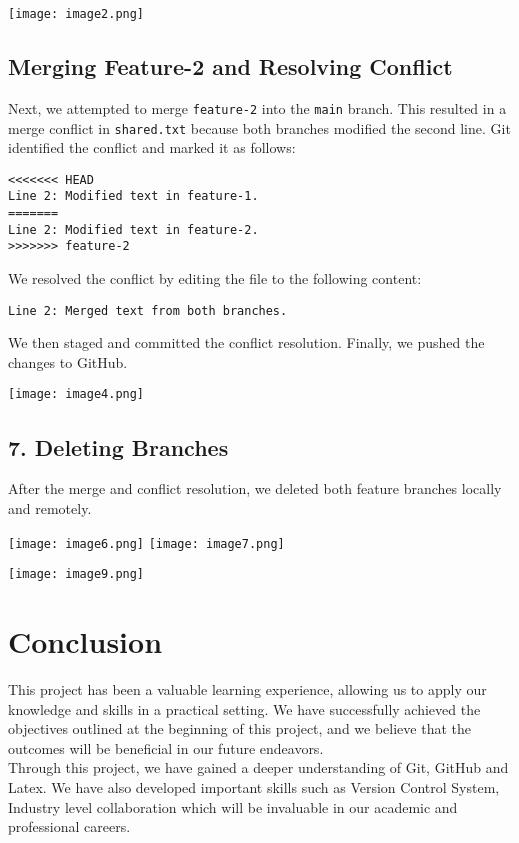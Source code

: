 \documentclass[a4paper,12pt]{article}
\begin{document}
\begin{center}
\texttt{[image: image2.png]} 
    \vspace{0.5cm}
\end{center}
\subsection{Merging Feature-2 and Resolving Conflict}
Next, we attempted to merge \texttt{feature-2} into the \texttt{main} branch. This resulted in a merge conflict in \texttt{shared.txt} because both branches modified the second line. Git identified the conflict and marked it as follows:
\begin{verbatim}
<<<<<<< HEAD
Line 2: Modified text in feature-1.
=======
Line 2: Modified text in feature-2.
>>>>>>> feature-2
\end{verbatim}
We resolved the conflict by editing the file to the following content:
\begin{verbatim}
Line 2: Merged text from both branches.
\end{verbatim}
We then staged and committed the conflict resolution. Finally, we pushed the changes to GitHub.\\

\begin{center}
     \texttt{[image: image4.png]} 
    \vspace{0.5cm}
\end{center}

\subsection*{7. Deleting Branches}
After the merge and conflict resolution, we deleted both feature branches locally and remotely.
\begin{center}
 \texttt{[image: image6.png]}
    \vspace{0.5cm}
     \texttt{[image: image7.png]}
    \vspace{0.5cm}
\end{center}
\begin{center}
\texttt{[image: image9.png]} 
    \vspace{0.5cm}
\end{center}
\newpage
\section{Conclusion}

This project has been a valuable learning experience, allowing us to apply our knowledge and skills in a practical setting. We have successfully achieved the objectives outlined at the beginning of this project, and we believe that the outcomes will be beneficial in our future endeavors.\\

Through this project, we have gained a deeper understanding of Git, GitHub and Latex. We have also developed important skills such as Version Control System, Industry level collaboration which will be invaluable in our academic and professional careers.
\end{document}
